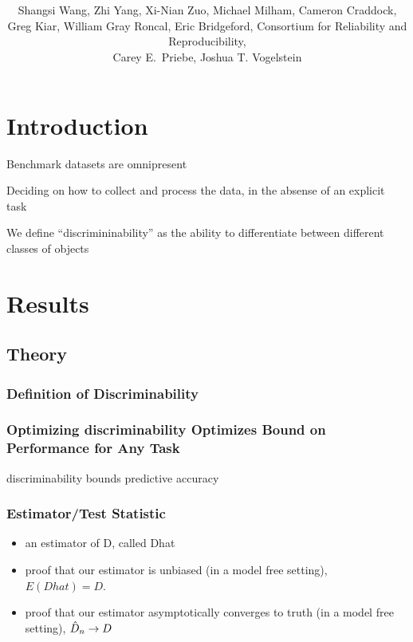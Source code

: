\documentclass{article}
\title{\vspace{-50pt}
\db{Optimal Design for Discovery Science via Maximizing Discriminability: \\ Applications in Neuroimaging}
}
\author{Shangsi Wang, Zhi Yang, Xi-Nian Zuo, Michael Milham, Cameron Craddock,  \\ 
Greg Kiar, William Gray Roncal, Eric Bridgeford,
Consortium for Reliability and Reproducibility, \\ Carey E.~Priebe, Joshua T. Vogelstein}
\begin{document}
\maketitle
\tableofcontents
\newpage

\section{Introduction}

 Benchmark datasets are omnipresent

 Deciding on how to collect and process the data, in the absense of an explicit task

 We define ``discrimininability'' as the ability to differentiate between different classes of objects



\section{Results}



\subsection{Theory}

\subsubsection{Definition of Discriminability}

\subsubsection{Optimizing discriminability Optimizes Bound on Performance for Any Task}


\begin{thm}
discriminability bounds predictive accuracy
\end{thm}


\subsubsection{Estimator/Test Statistic}

\begin{itemize}
\item an estimator of D, called Dhat

\item proof that our estimator is unbiased (in a model free setting), 
$E(Dhat)=D$.

\item proof that our estimator asymptotically converges to truth (in a model free setting), $\hat{D}_n \rightarrow D$
\end{itemize}
\end{document}
